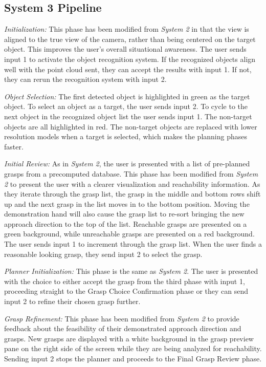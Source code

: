 \subsection{System 3 Pipeline}
\label{section:pipeline-v3}
\emph{Initialization:} This phase has been modified from \emph{System 2} in that the view is aligned to the true view of the camera, rather than being centered on the target object. This improves the user's overall situational awareness. The user sends input 1 to activate the object recognition system. If the recognized objects align well with the point cloud sent, they can accept the results with input 1. If not, they can rerun the recognition system with input 2.

\emph{Object Selection:} The first detected object is highlighted in green as the target object. To select an object as a target, the user sends input 2. To cycle to the next object in the recognized object list the user sends input 1. The non-target objects are all highlighted in red. The non-target objects are replaced with lower resolution models when a target is selected, which makes the planning phases faster. 

\emph{Initial Review:} As in \emph{System 2}, the user is presented with a list of pre-planned grasps from a precomputed database. This phase has been modified from \emph{System 2} to present the user with a clearer visualization and reachability information. As they iterate through the grasp list, the grasp in the middle and bottom rows shift up and the next grasp in the list moves in to the bottom position. Moving the demonstration hand will also cause the grasp list to re-sort bringing the new approach direction to the top of the list. Reachable grasps are presented on a green background, while unreachable grasps are presented on a red background. The user sends input 1 to increment through the grasp list. When the user finds a reasonable looking grasp, they send input 2 to select the grasp.

\emph{Planner Initialization:} This phase is the same as \emph{System 2}. The user is presented with the choice to either accept the grasp from the third phase with input 1, proceeding straight to the Grasp Choice Confirmation phase or they can send input 2 to refine their chosen grasp further.

\emph{Grasp Refinement:} This phase has been modified from \emph{System 2} to provide feedback about the feasibility of their demonstrated approach direction and grasps. New grasps are displayed with a white background in the grasp preview pane on the right side of the screen while they are being analyzed for reachability. Sending input 2 stops the planner and proceeds to the Final Grasp Review phase.

